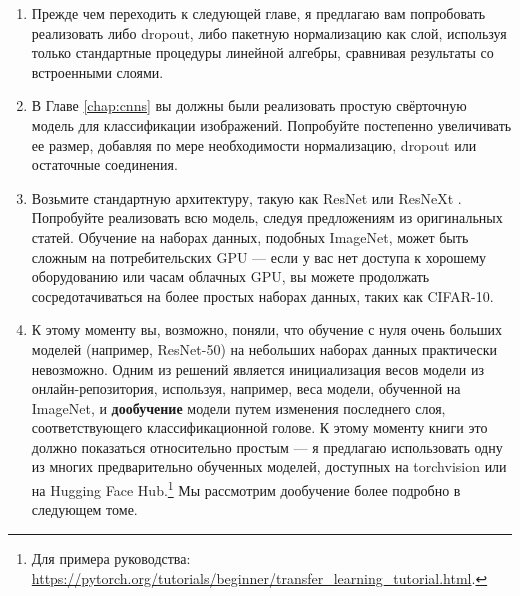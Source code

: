 \begin{enumerate}
\item Прежде чем переходить к следующей главе, я предлагаю вам попробовать реализовать либо dropout, либо пакетную нормализацию как слой, используя только стандартные процедуры линейной алгебры, сравнивая результаты со встроенными слоями.
\item В Главе \ref{chap:cnns} вы должны были реализовать простую свёрточную модель для классификации изображений. Попробуйте постепенно увеличивать ее размер, добавляя по мере необходимости нормализацию, dropout или остаточные соединения.
\item Возьмите стандартную архитектуру, такую как ResNet \cite{he2016deep} или ResNeXt \cite{liu2022convnet}. Попробуйте реализовать всю модель, следуя предложениям из оригинальных статей. Обучение на наборах данных, подобных ImageNet, может быть сложным на потребительских GPU — если у вас нет доступа к хорошему оборудованию или часам облачных GPU, вы можете продолжать сосредотачиваться на более простых наборах данных, таких как CIFAR-10.
\item К этому моменту вы, возможно, поняли, что обучение с нуля очень больших моделей (например, ResNet-50) на небольших наборах данных практически невозможно. Одним из решений является инициализация весов модели из онлайн-репозитория, используя, например, веса модели, обученной на ImageNet, и \textbf{дообучение} модели путем изменения последнего слоя, соответствующего классификационной голове. К этому моменту книги это должно показаться относительно простым — я предлагаю использовать одну из многих предварительно обученных моделей, доступных на torchvision или на Hugging Face Hub.\footnote{Для примера руководства: \url{https://pytorch.org/tutorials/beginner/transfer_learning_tutorial.html}.} Мы рассмотрим дообучение более подробно в следующем томе.

\end{enumerate}